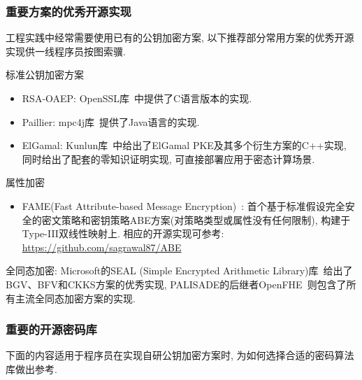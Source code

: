 \subsubsection{重要方案的优秀开源实现}
工程实践中经常需要使用已有的公钥加密方案, 以下推荐部分常用方案的优秀开源实现供一线程序员按图索骥. 
\begin{trivlist}
\item 标准公钥加密方案
\begin{itemize}
    \item RSA-OAEP: OpenSSL库~\cite{OpenSSL}中提供了C语言版本的实现. 

    \item Paillier: mpc4j库~\cite{mpc4j}提供了Java语言的实现. 

    \item ElGamal: Kunlun库~\cite{libKunlun}中给出了ElGamal PKE及其多个衍生方案的C++实现, 同时给出了配套的零知识证明实现, 可直接部署应用于密态计算场景. 
\end{itemize}

\item 属性加密
\begin{itemize}
    \item FAME(Fast Attribute-based Message Encryption)~\cite{AC-CCS-2017}: 
        首个基于标准假设完全安全的密文策略和密钥策略ABE方案(对策略类型或属性没有任何限制), 构建于Type-III双线性映射上. 
        相应的开源实现可参考: \url{https://github.com/sagrawal87/ABE} 
\end{itemize}

\item 全同态加密: Microsoft的SEAL (Simple Encrypted Arithmetic Library)库~\cite{SEAL}给出了BGV、BFV和CKKS方案的优秀实现, 
    PALISADE的后继者OpenFHE~\cite{OpenFHE}则包含了所有主流全同态加密方案的实现. 
\end{trivlist}

\subsubsection{重要的开源密码库}
下面的内容适用于程序员在实现自研公钥加密方案时, 为如何选择合适的密码算法库做出参考. 

